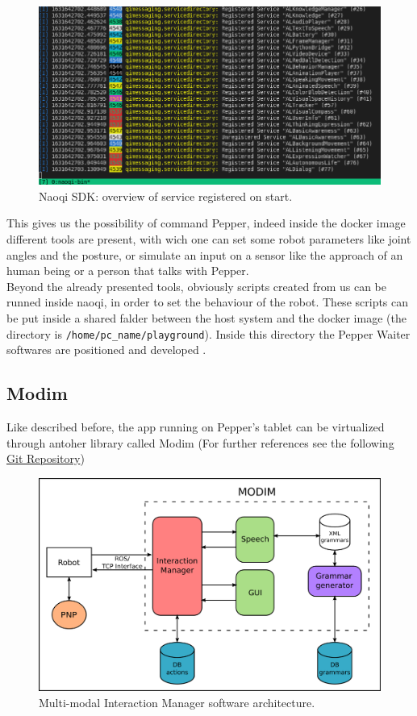 \documentclass[12pt, letterpaper, twoside]{article}
\begin{document}
\begin{figure}[htbp]
	\centerline{\includegraphics[scale=.6]{img/naoqi.png}}
	\caption{Naoqi SDK: overview of service registered on start.}
	\label{fig}
\end{figure}

This gives us the possibility of command Pepper, indeed inside the docker image different tools are present, with wich one can set some robot parameters like joint angles and the posture, or simulate an input on a sensor like the approach of an human being or a person that talks with Pepper.\\

Beyond the already presented tools, obviously scripts created from us can be runned inside naoqi, in order to set the behaviour of the robot. These scripts can be put inside a shared falder between the host system and the docker image (the directory is \verb|/home/pc_name/playground|). Inside this directory the Pepper Waiter softwares are positioned and developed .

\subsection{Modim}
Like described before, the app running on Pepper's tablet can be virtualized through antoher library called Modim (For further references see the following \href{https://bitbucket.org/mtlazaro/modim.git}{Git Repository})\\

\begin{figure}[htbp]
	\centerline{\includegraphics[scale=.6]{img/modim.png}}
	\caption{ Multi-modal Interaction Manager software architecture.}
	\label{fig:modim_architecture}
\end{figure}
\end{document}

